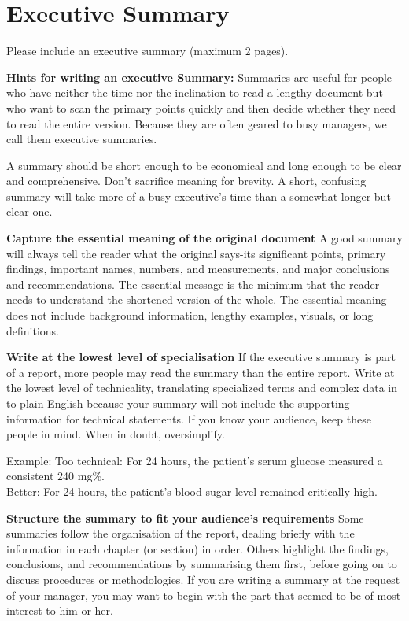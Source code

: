 
\chapter*{Executive Summary}

Please include an executive summary (maximum 2 pages).

\textbf{Hints for writing an executive Summary:} 
Summaries are useful for people who have neither the time nor the inclination to
read a lengthy document but who want to scan the primary points quickly and then
decide whether they need to read the entire version. Because they are often
geared to busy managers, we call them executive summaries.

A summary should be short enough to be economical and long enough to be clear and
comprehensive. Don't sacrifice meaning for brevity. A short, confusing summary
will take more of a busy executive's time than a somewhat longer but clear one.

\textbf{Capture the essential meaning of the original document}  
A good summary will always tell the reader what the original says-its significant
points, primary findings, important names, numbers, and measurements, and major
conclusions and recommendations. The essential message is the minimum that the
reader needs to understand the shortened version of the whole. The essential
meaning does not include background information, lengthy examples, visuals, or
long definitions.

\textbf{Write at the lowest level of specialisation}  
If the executive summary is part of a report, more people may read the summary
than the entire report. Write at the lowest level of technicality, translating
specialized terms and complex data in to plain English because your summary will
not include the supporting information for technical statements. If you know your
audience, keep these people in mind. When in doubt, oversimplify.

Example:  Too technical: For 24 hours, the patient's serum glucose measured a consistent 240 mg\%. \\
Better: For 24 hours, the patient's blood sugar level remained critically high.

\textbf{Structure the summary to fit your audience's requirements} 
Some summaries follow the organisation of the report, dealing briefly with the
information in each chapter (or section) in order. Others highlight the findings,
conclusions, and recommendations by summarising them first, before going on to
discuss procedures or methodologies. If you are writing a summary at the request
of your manager, you may want to begin with the part that seemed to be of most
interest to him or her.

